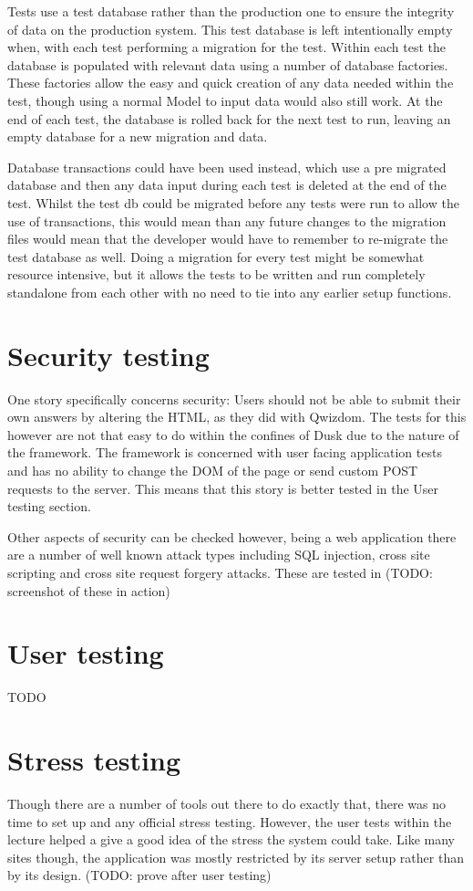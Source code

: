 Tests use a test database rather than the production one to ensure the integrity of data on the production system. This test database is left intentionally empty when, with each test performing a migration for the test. Within each test the database is populated with relevant data using a number of database factories. These factories allow the easy and quick creation of any data needed within the test, though using a normal Model to input data would also still work. At the end of each test, the database is rolled back for the next test to run, leaving an empty database for a new migration and data.

Database transactions could have been used instead, which use a pre migrated database and then any data input during each test is deleted at the end of the test. Whilst the test db could be migrated before any tests were run to allow the use of transactions, this would mean than any future changes to the migration files would mean that the developer would have to remember to re-migrate the test database as well. Doing a migration for every test might be somewhat resource intensive, but it allows the tests to be written and run completely standalone from each other with no need to tie into any earlier setup functions. 

\section{Security testing}
One story specifically concerns security: Users should not be able to submit their own answers by altering the HTML, as they did with Qwizdom. The tests for this however are not that easy to do within the confines of Dusk due to the nature of the framework. The framework is concerned with user facing application tests and has no ability to change the DOM of the page or send custom POST requests to the server. This means that this story is better tested in the User testing section.

Other aspects of security can be checked however, being a web application there are a number of well known attack types including SQL injection, cross site scripting and cross site request forgery attacks. These are tested in (TODO: screenshot of these in action)

\section{User testing}
TODO

\section{Stress testing}
Though there are a number of tools out there to do exactly that, there was no time to set up and any official stress testing. However, the user tests within the lecture helped a give a good idea of the stress the system could take. Like many sites though, the application was mostly restricted by its server setup rather than by its design. (TODO: prove after user testing)

